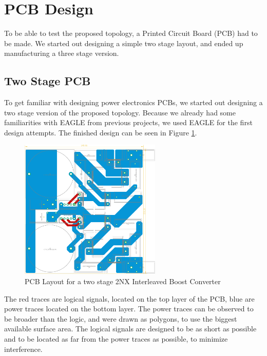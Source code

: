 \section{PCB Design}\label{sec:PCB}

To be able to test the proposed topology,
a Printed Circuit Board (PCB) had to be made.
We started out designing a simple two stage layout,
and ended up manufacturing a three stage version.

\subsection{Two Stage PCB}
To get familiar with designing power electronics PCBs,
we started out designing a two stage version of the proposed topology.
Because we already had some familiarities with EAGLE from previous projects,
we used EAGLE for the first design attempts.
The finished design can be seen in Figure \ref{fig:2nxeagle}.

\begin{figure}[H]
	\begin{center}
	\includegraphics[width=0.6\textwidth]{figures/05cPCBdesign/2NX_interleaved_boost_converter_EAGLE_BY_DANIEL.pdf}
	\end{center}
	\caption{PCB Layout for a two stage 2NX Interleaved Boost Converter}
	\label{fig:2nxeagle}
\end{figure}

The red traces are logical signals,
located on the top layer of the PCB,
blue are power traces located on the bottom layer.
The power traces can be observed to be broader than the logic,
and were drawn as polygons,
to use the biggest available surface area.
The logical signals are designed to be as short as possible
and to be located as far from the power traces as possible,
to minimize interference.


